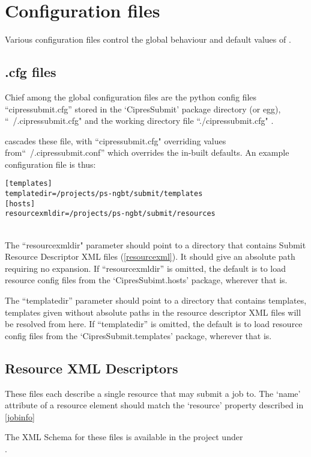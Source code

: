 \section{Configuration files}
Various configuration files control the global behaviour and default values of \theprog .

\subsection{.cfg files}
Chief among the global configuration files are the python config files
``cipressubmit.cfg'' stored in the `CipresSubmit' package directory (or
egg), ``~/.cipressubmit.cfg" and the working directory file
``./cipressubmit.cfg" .

\theprog cascades these file, with ``cipressubmit.cfg" overriding values
from``~/.cipressubmit.conf'' which overrides the in-built defaults. An example
configuration file is thus:
~\\
\begin{verbatim}
[templates]
templatedir=/projects/ps-ngbt/submit/templates
[hosts]
resourcexmldir=/projects/ps-ngbt/submit/resources
\end{verbatim}
~\\
The ``resourcexmldir" parameter should point to a directory that contains Submit Resource Descriptor XML files (\ref{resourcexml}). It should give an absolute path requiring no expansion.
If ``resourcexmldir'' is omitted, the default is to load resource config files from the `CipresSubimt.hosts' package, wherever that is.

The ``templatedir'' parameter should point to a directory that contains templates, templates given without absolute paths in the resource descriptor XML files will be resolved from here.
If ``templatedir'' is omitted, the default is to load resource config files from the `CipresSubmit.templates' package, wherever that is.

\subsection{Resource XML Descriptors\label{resourcexml}}
These files each describe a single resource that \theprog may submit a job to.
The `name' attribute of a resource element should match the `resource' property described in  \ref{jobinfo}

The XML Schema for these files is available in the project under\\ .


